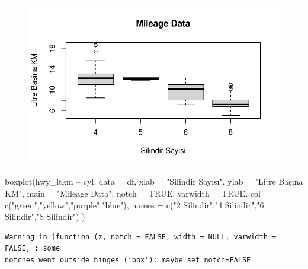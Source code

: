 \documentclass[
  letterpaper,
  DIV=11,
  numbers=noendperiod]{scrreprt}
\newenvironment{Shaded}{\begin{snugshade}}{\end{snugshade}}
\newcommand{\AttributeTok}[1]{\textcolor[rgb]{0.40,0.45,0.13}{#1}}
\newcommand{\ConstantTok}[1]{\textcolor[rgb]{0.56,0.35,0.01}{#1}}
\newcommand{\FunctionTok}[1]{\textcolor[rgb]{0.28,0.35,0.67}{#1}}
\newcommand{\NormalTok}[1]{\textcolor[rgb]{0.00,0.23,0.31}{#1}}
\newcommand{\SpecialCharTok}[1]{\textcolor[rgb]{0.37,0.37,0.37}{#1}}
\newcommand{\StringTok}[1]{\textcolor[rgb]{0.13,0.47,0.30}{#1}}
\begin{document}
\begin{figure}[H]

{\centering \includegraphics{data_analysis_files/figure-pdf/unnamed-chunk-2-6.pdf}

}

\end{figure}

\begin{Shaded}
\begin{Highlighting}[]
\FunctionTok{boxplot}\NormalTok{(hwy\_ltkm }\SpecialCharTok{\textasciitilde{}}\NormalTok{ cyl, }\AttributeTok{data =}\NormalTok{ df, }
   \AttributeTok{xlab =} \StringTok{"Silindir Sayısı"}\NormalTok{,}
   \AttributeTok{ylab =} \StringTok{"Litre Başına KM"}\NormalTok{, }
   \AttributeTok{main =} \StringTok{"Mileage Data"}\NormalTok{,}
   \AttributeTok{notch =} \ConstantTok{TRUE}\NormalTok{, }
   \AttributeTok{varwidth =} \ConstantTok{TRUE}\NormalTok{, }
   \AttributeTok{col =} \FunctionTok{c}\NormalTok{(}\StringTok{"green"}\NormalTok{,}\StringTok{"yellow"}\NormalTok{,}\StringTok{"purple"}\NormalTok{,}\StringTok{"blue"}\NormalTok{),}
   \AttributeTok{names =} \FunctionTok{c}\NormalTok{(}\StringTok{"2 Silindir"}\NormalTok{,}\StringTok{"4 Silindir"}\NormalTok{,}\StringTok{"6 Silindir"}\NormalTok{,}\StringTok{"8 Silindir"}\NormalTok{)}
\NormalTok{)}
\end{Highlighting}
\end{Shaded}

\begin{verbatim}
Warning in (function (z, notch = FALSE, width = NULL, varwidth = FALSE, : some
notches went outside hinges ('box'): maybe set notch=FALSE
\end{verbatim}
\end{document}
